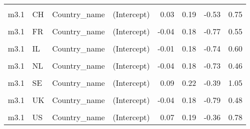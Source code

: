 \begin{table}
\begin{tabular}[t]{llllrrrr}
\cellcolor{gray!10}{m3.1} & \cellcolor{gray!10}{CA} & \cellcolor{gray!10}{Country\_name} & \cellcolor{gray!10}{EPS} & \cellcolor{gray!10}{-0.02} & \cellcolor{gray!10}{0.09} & \cellcolor{gray!10}{-0.25} & \cellcolor{gray!10}{0.19}\\
m3.1 & CH & Country\_name & (Intercept) & 0.03 & 0.19 & -0.53 & 0.75\\
\cellcolor{gray!10}{m3.1} & \cellcolor{gray!10}{CH} & \cellcolor{gray!10}{Country\_name} & \cellcolor{gray!10}{EPS} & \cellcolor{gray!10}{0.08} & \cellcolor{gray!10}{0.09} & \cellcolor{gray!10}{-0.13} & \cellcolor{gray!10}{0.29}\\
m3.1 & FR & Country\_name & (Intercept) & -0.04 & 0.18 & -0.77 & 0.55\\
\cellcolor{gray!10}{m3.1} & \cellcolor{gray!10}{FR} & \cellcolor{gray!10}{Country\_name} & \cellcolor{gray!10}{EPS} & \cellcolor{gray!10}{-0.11} & \cellcolor{gray!10}{0.09} & \cellcolor{gray!10}{-0.32} & \cellcolor{gray!10}{0.09}\\
m3.1 & IL & Country\_name & (Intercept) & -0.01 & 0.18 & -0.74 & 0.60\\
\cellcolor{gray!10}{m3.1} & \cellcolor{gray!10}{IL} & \cellcolor{gray!10}{Country\_name} & \cellcolor{gray!10}{EPS} & \cellcolor{gray!10}{-0.01} & \cellcolor{gray!10}{0.17} & \cellcolor{gray!10}{-0.39} & \cellcolor{gray!10}{0.37}\\
m3.1 & NL & Country\_name & (Intercept) & -0.04 & 0.18 & -0.73 & 0.46\\
\cellcolor{gray!10}{m3.1} & \cellcolor{gray!10}{NL} & \cellcolor{gray!10}{Country\_name} & \cellcolor{gray!10}{EPS} & \cellcolor{gray!10}{-0.10} & \cellcolor{gray!10}{0.10} & \cellcolor{gray!10}{-0.32} & \cellcolor{gray!10}{0.13}\\
m3.1 & SE & Country\_name & (Intercept) & 0.09 & 0.22 & -0.39 & 1.05\\
\cellcolor{gray!10}{m3.1} & \cellcolor{gray!10}{SE} & \cellcolor{gray!10}{Country\_name} & \cellcolor{gray!10}{EPS} & \cellcolor{gray!10}{0.23} & \cellcolor{gray!10}{0.10} & \cellcolor{gray!10}{-0.01} & \cellcolor{gray!10}{0.45}\\
m3.1 & UK & Country\_name & (Intercept) & -0.04 & 0.18 & -0.79 & 0.48\\
\cellcolor{gray!10}{m3.1} & \cellcolor{gray!10}{UK} & \cellcolor{gray!10}{Country\_name} & \cellcolor{gray!10}{EPS} & \cellcolor{gray!10}{-0.12} & \cellcolor{gray!10}{0.10} & \cellcolor{gray!10}{-0.35} & \cellcolor{gray!10}{0.10}\\
m3.1 & US & Country\_name & (Intercept) & 0.07 & 0.19 & -0.36 & 0.78\\

\end{tabular}
\end{table}
